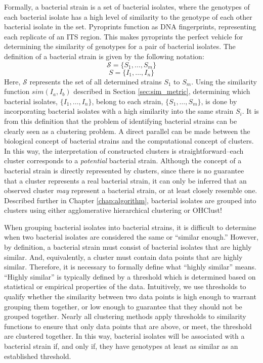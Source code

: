 \documentclass[12pt]{ucthesis}
\begin{document}
      Formally, a bacterial strain is a set of bacterial isolates, where the
      genotypes of each bacterial isolate has a high level of similarity to the
      genotype of each other bacterial isolate in the set. Pyroprints function
      as DNA fingerprints, representing each replicate of an ITS region. This
      makes pyroprints the perfect vehicle for determining the similarity of
      genotypes for a pair of bacterial isolates. The definition of a
      bacterial strain is given by the following notation:
      $$\mathcal{S} = \{S_1, \ldots, S_m\}$$
      $$S = \{I_1, \ldots, I_n\}$$
      Here, $\mathcal{S}$ represents the set of all determined strains $S_1$ to
      $S_m$. Using the similarity function $sim(I_{a}, I_{b})$ described in Section
      \ref{sec:sim_metric}, determining which bacterial isolates, $\{I_1,
      \ldots, I_n\}$, belong to each strain, $\{S_1, \ldots, S_m\}$, is done by
      incorporating bacterial isolates with a high similarity into the same
      strain $S_i$. It is from this definition that the problem of identifying
      bacterial strains can be clearly seen as a clustering problem. A direct
      parallel can be made between the biological concept of bacterial strains
      and the computational concept of clusters. In this way, the
      interpretation of constructed clusters is straightforward--each cluster
      corresponds to a \textit{potential} bacterial strain. Although the
      concept of a bacterial strain is directly represented by clusters, since
      there is no guarantee that a cluster represents a real bacterial strain,
      it can only be inferred that an observed cluster \textit{may} represent a
      bacterial strain, or at least closely resemble one. Described further in
      Chapter \ref{chap:algorithm}, bacterial isolates are grouped into
      clusters using either \textsf{agglomerative hierarchical clustering} or
      \textsf{OHClust!}

      When grouping bacterial isolates into bacterial strains, it is difficult
      to determine when two bacterial isolates are considered the same or
      ``similar enough.'' However, by definition, a bacterial strain must
      consist of bacterial isolates that are highly similar. And, equivalently,
      a cluster must contain data points that are highly similar. Therefore, it
      is necessary to formally define what ``highly similar'' means. ``Highly
      similar'' is typically defined by a threshold which is determined based
      on statistical or empirical properties of the data. Intuitively, we use
      thresholds to qualify whether the similarity between two data points is
      high enough to warrant grouping them together, or low enough to guarantee
      that they should not be grouped together. Nearly all clustering methods
      apply thresholds to similarity functions to ensure that only data points
      that are above, or meet, the threshold are clustered together. In this
      way, bacterial isolates will be associated with a bacterial strain if,
      and only if, they have genotypes at least as similar as an established
      threshold.
\end{document}
